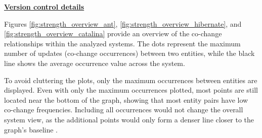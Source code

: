 \begin{table}[H]
\renewcommand{\arraystretch}{1}
\caption{Found systems and versions of the systems in GitHub. }
\label{tab:gitfoundsystems}
\centering
{}
\end{table}

\hspace{-4em}\underline{\textbf{Version control details}}

Figures \ref{fig:strength_overview_ant}, \ref{fig:strength_overview_hibernate}, and \ref{fig:strength_overview_catalina} provide an overview of the co-change relationships within the analyzed systems. The dots represent the maximum number of updates (co-change occurrences) between two entities, while the black line shows the average occurrence value across the system.

To avoid cluttering the plots, only the maximum occurrences between entities are displayed. Even with only the maximum occurrences plotted,  most points are still located near the bottom of the graph, showing that most entity pairs have low co-change frequencies. Including all occurrences would not change the overall system view, as the additional points would only form a denser line closer to the graph’s baseline \cite{b4}.



